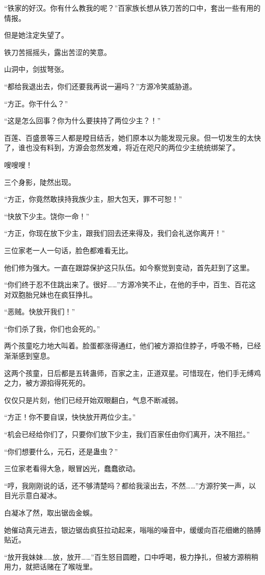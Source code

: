 \begin{this_body}
“铁家的好汉。你有什么教我的呢？”百家族长想从铁刀苦的口中，套出一些有用的情报。

但是她注定失望了。

铁刀苦摇摇头，露出苦涩的笑意。

山洞中，剑拔弩张。

“都给我退出去，你们还要我再说一遍吗？”方源冷笑威胁道。

“方正。你干什么？”

“这是怎么回事？你为什么要挟持了两位少主？！”

百莲、百盛景等三人都是瞠目结舌，她们原本以为能发现元泉。但一切发生的太快了，谁也没有料到，方源会忽然发难，将近在咫尺的两位少主统统绑架了。

嗖嗖嗖！

三个身影，陡然出现。

“方正，你竟然敢挟持我族少主，胆大包天，罪不可恕！”

“快放下少主。饶你一命！”

“方正，你现在放下少主，跟我们回去还来得及，我们会礼送你离开！”

三位家老一人一句话，脸色都难看无比。

他们修为强大。一直在跟踪保护这只队伍。如今察觉到变动，首先赶到了这里。

“你们终于忍不住跳出来了。很好……”方源冷笑不止，在他的手中，百生、百花这对双胞胎兄妹也在疯狂挣扎。

“恶贼。快放开我们！”

“你们杀了我，你们也会死的。”

两个孩童吃力地大叫着。脸蛋都涨得通红，他们被方源掐住脖子，呼吸不畅，已经渐渐感到窒息。

这两个孩童，日后都是五转蛊师，百家之主，正道双星。可惜现在，他们手无缚鸡之力，被方源掐得死死的。

仅仅只是片刻，他们已经开始双眼翻白，气息不断减弱。

“方正！你不要自误，快快放开两位少主。”

“机会已经给你们了，只要你们放下少主，我们百家任由你们离开，决不阻拦。”

“你们想要什么，元石，还是蛊虫？”

三位家老看得大急，眼冒凶光，蠢蠢欲动。

“哼，我刚刚说的话，还不够清楚吗？都给我滚出去，不然……”方源狞笑一声，以目光示意白凝冰。

白凝冰了然，取出锯齿金蜈。

她催动真元进去，银边锯齿疯狂拉动起来，嗡嗡的噪音中，缓缓向百花细嫩的胳膊贴近。

“放开我妹妹……放，放开……”百生怒目圆瞪，口中呼喝，极力挣扎，但被方源稍稍用力，就把话赌在了喉咙里。


\end{this_body}
